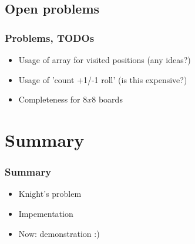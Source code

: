 \documentclass{beamer}
\begin{document}
\subsection{Open problems}
\begin{frame}
\frametitle{Problems, TODOs}
\begin{itemize}
	\item Usage of array for visited positions (any ideas?)
	\item Usage of 'count +1/-1 roll' (is this expensive?)
	\item Completeness for $8 x 8$ boards
\end{itemize}
\end{frame}

\section{Summary}
\begin{frame}
\frametitle{Summary}
\begin{itemize}
	\item Knight's problem
	\item Impementation
	\item Now: demonstration :)
\end{itemize}
\end{frame}
\end{document}
